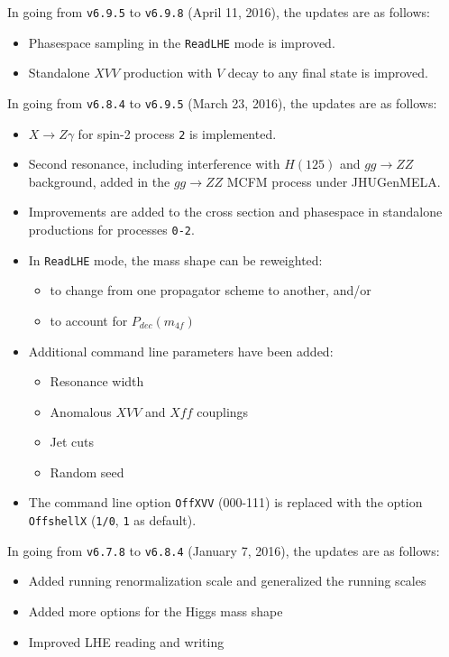 \documentclass[aps,superscriptaddress,nofootinbib]{revtex4}
\begin{document}
\noindent
In going from \verb|v6.9.5| to \verb|v6.9.8| (April 11, 2016), the updates are as follows:
\begin{itemize}
\item Phasespace sampling in the \verb|ReadLHE| mode is improved.
\item Standalone $XVV$ production with $V$ decay to any final state is improved.
\end{itemize}
\noindent
In going from \verb|v6.8.4| to \verb|v6.9.5| (March 23, 2016), the updates are as follows:
\begin{itemize}
\item $X\to Z\gamma$ for spin-2 process \verb|2| is implemented.
\item Second resonance, including interference with $H(125)$ and $gg\to ZZ$ background, added in the $gg\to ZZ$ MCFM process under JHUGenMELA.
\item Improvements are added to the cross section and phasespace in standalone productions for processes \verb|0-2|.
\item In \verb|ReadLHE| mode, the mass shape can be reweighted:
\begin{itemize}
\item to change from one propagator scheme to another, and/or
\item to account for $P_{dec}(m_{4f})$
\end{itemize}
\item Additional command line parameters have been added:
\begin{itemize}
\item Resonance width
\item Anomalous $XVV$ and $Xff$ couplings
\item Jet cuts
\item Random seed
\end{itemize}
\item The command line option \verb|OffXVV| (000-111) is replaced with the option \verb|OffshellX| (\verb|1/0|, \verb|1| as default).
\end{itemize}
\noindent
In going from \verb|v6.7.8| to \verb|v6.8.4| (January 7, 2016), the updates are as follows:
\begin{itemize}
\item Added running renormalization scale and generalized the running scales
\item Added more options for the Higgs mass shape
\item Improved LHE reading and writing
\end{itemize}
\end{document}
